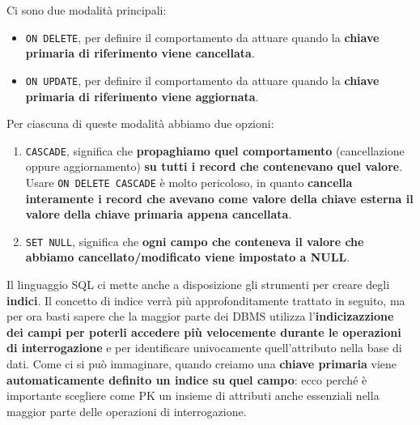 \documentclass[12pt]{report}
\begin{document}
	Ci sono due modalità principali:
	\begin{itemize}
		\item \texttt{ON DELETE}, per definire il comportamento da attuare quando la \textbf{chiave primaria di riferimento viene cancellata}.
		
		\item \texttt{ON UPDATE}, per definire il comportamento da attuare quando la \textbf{chiave primaria di riferimento viene aggiornata}.
	\end{itemize}
	Per ciascuna di queste modalità abbiamo due opzioni:
	\begin{enumerate}
		\item \texttt{CASCADE}, significa che \textbf{propaghiamo quel comportamento} (cancellazione oppure aggiornamento) \textbf{su tutti i record che contenevano quel valore}. Usare \texttt{ON DELETE CASCADE} è molto pericoloso, in quanto \textbf{cancella interamente i record che avevano come valore della chiave esterna il valore della chiave primaria appena cancellata}.
		
		\item \texttt{SET NULL}, significa che \textbf{ogni campo che conteneva il valore che abbiamo cancellato/modificato viene impostato a NULL}.
	\end{enumerate}
	
	Il linguaggio SQL ci mette anche a disposizione gli strumenti per creare degli \textbf{indici}. Il concetto di indice verrà più approfonditamente trattato in seguito, ma per ora basti sapere che la maggior parte dei DBMS utilizza l'\textbf{indicizazzione dei campi per poterli accedere più velocemente durante le operazioni di interrogazione} e per identificare univocamente quell'attributo nella base di dati. Come ci si può immaginare, quando creiamo una \textbf{chiave primaria} viene \textbf{automaticamente definito un indice su quel campo}: ecco perché è importante scegliere come PK un insieme di attributi anche essenziali nella maggior parte delle operazioni di interrogazione.
	\smallbreak
	
\end{document}
